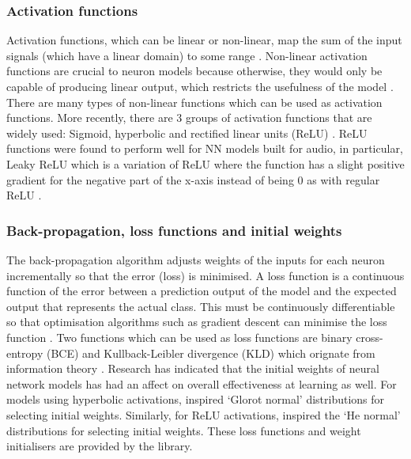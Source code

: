 \documentclass[12pt]{article}
\begin{document}
    \subsubsection{Activation functions}
    \label{sec:activation_functions}
    
    Activation functions, which can be linear or non-linear, map the sum of the input signals (which have a linear domain) to some range \parencite{Nwankpa2018}. Non-linear activation functions are crucial to neuron models because otherwise, they would only be capable of producing linear output, which restricts the usefulness of the model \parencite[p.567-568]{Russell;Norvig1995}. There are many types of non-linear functions which can be used as activation functions. More recently, there are 3 groups of activation functions that are widely used: Sigmoid, hyperbolic and rectified linear units (ReLU) \parencite{Nwankpa2018}. ReLU functions were found to perform well for NN models built for audio, in particular, Leaky ReLU which is a variation of ReLU where the function has a slight positive gradient for the negative part of the x-axis instead of being 0 as with regular ReLU \parencite{Maas2013}.
    
    \subsubsection{Back-propagation, loss functions and initial weights}
	\label{sec:backprop_and_loss}
	
	The back-propagation algorithm adjusts weights of the inputs for each neuron incrementally so that the error (loss) is minimised. A loss function is a continuous function of the error between a prediction output of the model and the expected output that represents the actual class. This must be continuously differentiable so that optimisation algorithms such as gradient descent can minimise the loss function \parencite[p.580-581]{Russell;Norvig1995}.
	Two functions which can be used as loss functions are binary cross-entropy (BCE) and Kullback-Leibler divergence (KLD) which orignate from information theory \parencite[p.34, p.67]{MacKay2013}. Research has indicated that the initial weights of neural network models has had an affect on overall effectiveness at learning as well. For models using hyperbolic activations, \textcite{Glorot2010} inspired `Glorot normal' distributions for selecting initial weights. Similarly, for ReLU activations, \textcite{HeNorm2015} inspired the `He normal' distributions for selecting initial weights. These loss functions and weight initialisers are provided by the \textcite{Keras} library.
	
\end{document}
